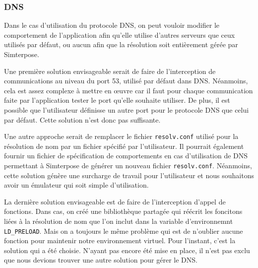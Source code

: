 \subsubsection{DNS}

Dans le cas d'utilisation du protocole DNS, on peut vouloir modifier le
comportement de l'application afin qu'elle utilise d'autres serveurs que ceux
utilisés par défaut, ou aucun afin que la résolution soit entièrement gérée par
Simterpose. 

Une première solution envisageable serait de faire de l'interception de
communications au niveau du port 53, utilisé par défaut dans DNS. Néanmoins,
cela est assez complexe à mettre en \oe uvre car il faut pour chaque
communication faite par l'application tester le port qu'elle souhaite
utiliser. De plus, il est possible que l'utilisateur définisse un autre port
pour le protocole DNS que celui par défaut. Cette solution n'est donc pas
suffisante.

Une autre approche serait de remplacer le fichier \texttt{resolv.conf} utilisé
pour la résolution de nom par un fichier spécifié par l'utilisateur. Il pourrait également fournir un fichier de spécification de
comportements en cas d'utilisation de DNS permettant à Simterpose de générer un
nouveau fichier \texttt{resolv.conf}. Néanmoins, cette solution génère une
surcharge de travail pour l'utilisateur et nous souhaitons avoir un émulateur
qui soit simple d'utilisation.

La dernière solution envisageable est de faire de l'interception d'appel de
fonctions. Dans cas, on créé une bibliothèque partagée qui réécrit les foncitons
liées à la résolution de nom que l'on inclut dans la variable d'environnemnt
\texttt{LD\_PRELOAD}. Mais on a toujours le même problème qui est de n'oublier
aucune fonction pour maintenir notre environnement virtuel. Pour l'instant,
c'est la solution qui a été choisie. N'ayant pas encore été mise en place, il
n'est pas exclu que nous devions trouver une autre solution pour gérer le DNS.

\vspace{0.5cm}
